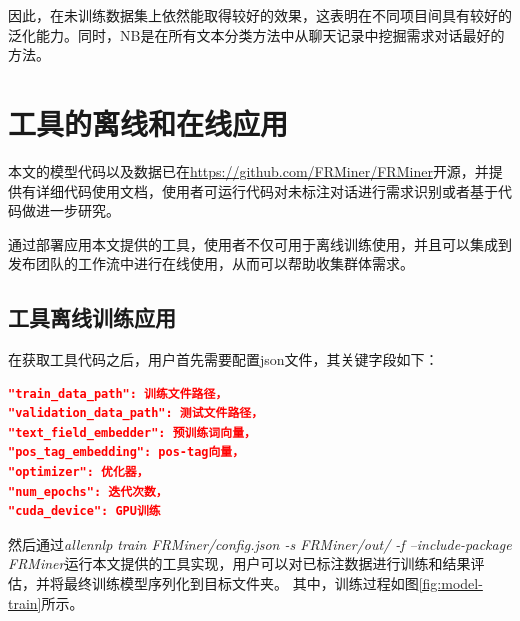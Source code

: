 因此，{\tool}在未训练数据集上依然能取得较好的效果，这表明{\tool}在不同项目间具有较好的泛化能力。同时，NB是在所有文本分类方法中从聊天记录中挖掘需求对话最好的方法。

\section{{\tool}工具的离线和在线应用}

本文的{\tool}模型代码以及数据已在\href{https://github.com/FRMiner/FRMiner}{https://github.com/FRMiner/FRMiner}开源，并提供有详细代码使用文档，使用者可运行代码对未标注对话进行需求识别或者基于代码做进一步研究。

通过部署应用本文提供的{\tool}工具，使用者不仅可用于离线训练使用，并且可以集成到发布团队的工作流中进行在线使用，从而可以帮助收集群体需求。

\subsection{{\tool}工具离线训练应用}
在获取{\tool}工具代码之后，用户首先需要配置json文件，其关键字段如下：
\begin{lstlisting}[language = json]
"train_data_path": 训练文件路径，
"validation_data_path": 测试文件路径，
"text_field_embedder": 预训练词向量，
"pos_tag_embedding": pos-tag向量，
"optimizer": 优化器，
"num_epochs": 迭代次数，
"cuda_device": GPU训练
\end{lstlisting}
然后通过\textit{allennlp train FRMiner/config.json -s FRMiner/out/ -f --include-package FRMiner}运行本文提供的{\tool}工具实现，用户可以对已标注数据进行训练和结果评估，并将最终训练模型序列化到目标文件夹。
其中，训练过程如图\ref{fig:model-train}所示。

